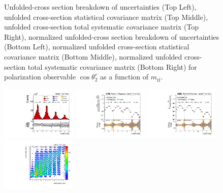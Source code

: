 \begin{figure}[htb]
\begin{center}
\caption{Unfolded-cross section breakdown of uncertainties (Top Left), unfolded cross-section statistical covariance matrix (Top Middle), unfolded cross-section total systematic covariance matrix (Top Right), normalized unfolded-cross section breakdown of uncertainties (Bottom Left), normalized unfolded cross-section statistical covariance matrix (Bottom Middle), normalized unfolded cross-section total systematic covariance matrix (Bottom Right) for polarization observable $\cos\theta_{2}^{r}$ as a function of $m_{t\bar{t}}$.}
\label{fig:b2r_mttbar_uncertainties}
\end{center}
\end{figure}
\clearpage
\begin{figure}[htb]
\begin{center}
 \includegraphics[width=0.32\textwidth]{fig_fullRun2UL/controlplots/combined/Hyp_LLBarCkk_vs_TTBarMass.pdf}
 \includegraphics[width=0.32\textwidth]{fig_fullRun2UL/unfolding/combined/UnfoldedResults_c_kk_mttbar.pdf}
 \includegraphics[width=0.32\textwidth]{fig_fullRun2UL/unfolding/combined/UnfoldedResultsNorm_c_kk_mttbar.pdf} \\
 \includegraphics[width=0.32\textwidth]{fig_fullRun2UL/unfolding/combined/ResponseMatrix_c_kk_mttbar.pdf}

\end{center}
\end{figure}
